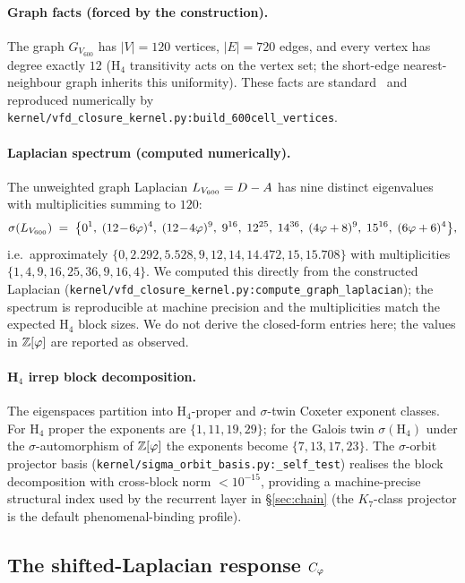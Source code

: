 \paragraph{Graph facts (forced by the construction).}
The graph $G_{V_{600}}$ has $|V|=120$ vertices, $|E|=720$ edges, and
every vertex has degree exactly $12$ (H$_4$ transitivity acts on the
vertex set; the short-edge nearest-neighbour graph inherits this
uniformity). These facts are standard~\citep{CoxeterRegularPolytopes,Weisstein600Cell}
and reproduced numerically by
\texttt{kernel/vfd\_closure\_kernel.py:build\_600cell\_vertices}.

\paragraph{Laplacian spectrum (computed numerically).}
The unweighted graph Laplacian $L_{V_{600}} = D - A$ has nine distinct
eigenvalues with multiplicities summing to $120$:
\[
\sigma(L_{V_{600}}) \;=\;
\bigl\{0^{1},\;
       (12\!-\!6\varphi)^{4},\;
       (12\!-\!4\varphi)^{9},\;
       9^{16},\;
       12^{25},\;
       14^{36},\;
       (4\varphi + 8)^{9},\;
       15^{16},\;
       (6\varphi + 6)^{4}\bigr\},
\]
i.e.\ approximately $\{0, 2.292, 5.528, 9, 12, 14, 14.472, 15, 15.708\}$
with multiplicities $\{1, 4, 9, 16, 25, 36, 9, 16, 4\}$. We computed
this directly from the constructed Laplacian
(\texttt{kernel/vfd\_closure\_kernel.py:compute\_graph\_laplacian});
the spectrum is reproducible at machine precision and the
multiplicities match the expected H$_4$ block sizes. We do not derive
the closed-form entries here; the values in $\mathbb{Z}[\varphi]$ are
reported as observed.

\paragraph{H$_4$ irrep block decomposition.}
The eigenspaces partition into H$_4$-proper and $\sigma$-twin Coxeter
exponent classes. For H$_4$ proper the exponents are $\{1, 11, 19, 29\}$;
for the Galois twin $\sigma(\mathrm{H}_4)$ under the $\sigma$-automorphism
of $\mathbb{Z}[\varphi]$ the exponents become $\{7, 13, 17, 23\}$. The
$\sigma$-orbit projector basis
(\texttt{kernel/sigma\_orbit\_basis.py:\_self\_test}) realises the block
decomposition with cross-block norm $<10^{-15}$, providing a
machine-precise structural index used by the recurrent layer in
\S\ref{sec:chain} (the $K_{7}$-class projector is the default
phenomenal-binding profile).

\subsection{The shifted-Laplacian response \texorpdfstring{$C_{\varphi}$}{C\_phi}}\label{ssec:cphi}

